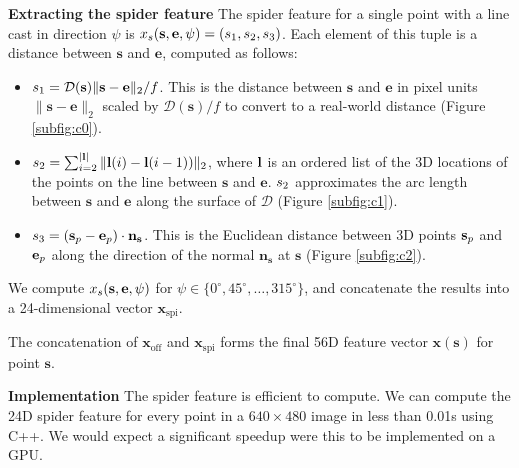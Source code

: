 \documentclass[10pt,twocolumn,letterpaper]{article}
\newcommand{\degree}{^{\circ}}
\newcommand{\feat}{\mathbf{x}}
\newcommand{\rgbdimage}{\mathcal{D}}
\newcommand{\pixelidx}{\mathbf{s}}
\newcommand{\edgeimidx}{\mathbf{e}}
\newcommand{\normal}{\mathbf{n}}
\renewcommand{\paragraph}{\vspace{2pt}\noindent\textbf}
\begin{document}
\paragraph{Extracting the spider feature}
The spider feature for a single point with a line cast in direction $\psi$ is $\scalfeat_s(\pixelidx, \edgeimidx, \psi) = (\spiderfeat_1, \spiderfeat_2, \spiderfeat_3)$.
Each element of this tuple is a distance between $\pixelidx$ and $\edgeimidx$, computed as follows:
\begin{itemize}

\item $\spiderfeat_1 = \rgbdimage(\pixelidx) \|\pixelidx - \edgeimidx\|_2 / f$. This is the distance between $\pixelidx$ and $\edgeimidx$ in pixel units $\|\pixelidx - \edgeimidx\|_2$ scaled by $\rgbdimage(\pixelidx) / f$ to convert to a real-world distance (Figure \ref{subfig:c0}).

\item $s_2 = \sum_{i=2}^{|\mathbf{l}|} \| \mathbf{l}(i) - \mathbf{l}(i-1)) \|_2 $, where $\mathbf{l}$ is an ordered list of the 3D locations of the points on the line between $\pixelidx$ and $\edgeimidx$.
$s_2$ approximates the arc length between $\pixelidx$ and $\edgeimidx$ along the surface of $\rgbdimage$  (Figure \ref{subfig:c1}).

\item $\spiderfeat_3 = (\pointthreed - \edgethreed) \cdot \normal_\pixelidx$. 
This is the Euclidean distance between 3D points $\pointthreed$ and $\edgethreed$ along the direction of the normal $\normal_\pixelidx$ at $\pixelidx$  (Figure \ref{subfig:c2}).

\end{itemize}

We compute $\scalfeat_s(\pixelidx, \edgeimidx, \psi)$ for  $\psi \in \{0\degree, 45\degree, \ldots, 315\degree\}$, and concatenate the results into a  24-dimensional vector $\feat_{\text{spi}}$.

The concatenation of $\feat_\text{off}$ and $\feat_\text{spi}$ forms the final 56D feature vector $\feat(\pixelidx)$ for point $\pixelidx$.

\paragraph{Implementation}
The spider feature is efficient to compute.
We can compute the 24D spider feature for every point in a $640\times480$ image in less than 0.01s using C++.
We would expect a significant speedup were this to be implemented on a GPU.
\end{document}
